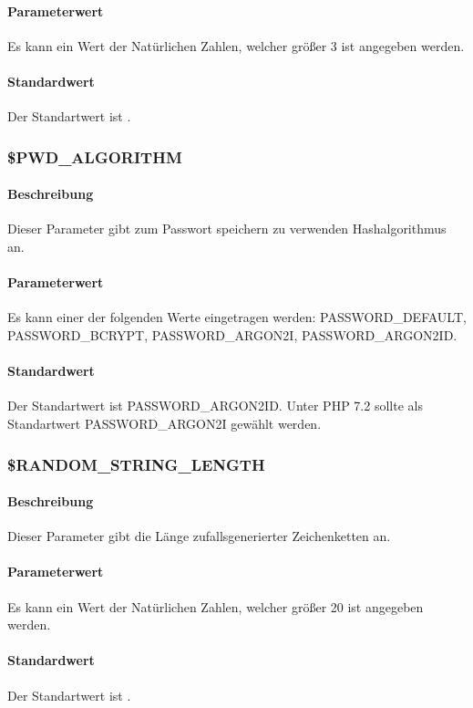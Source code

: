 \paragraph{Parameterwert}Es kann ein Wert der Natürlichen Zahlen, welcher größer 3 ist angegeben werden.
\paragraph{Standardwert}Der Standartwert ist {\grqq}.

\subsubsection{\$PWD\_ALGORITHM}
\paragraph{Beschreibung}Dieser Parameter gibt zum Passwort speichern zu verwenden Hashalgorithmus an. 
\paragraph{Parameterwert}Es kann einer der folgenden Werte eingetragen werden: {\glqq PASSWORD\_DEFAULT\grqq}, {\glqq PASSWORD\_BCRYPT\grqq}, {\glqq PASSWORD\_ARGON2I\grqq}, {\glqq PASSWORD\_ARGON2ID\grqq}.
\paragraph{Standardwert}Der Standartwert ist {\glqq PASSWORD\_ARGON2ID\grqq}. Unter PHP 7.2 sollte als Standartwert {\glqq PASSWORD\_ARGON2I\grqq} gewählt werden.

\subsubsection{\$RANDOM\_STRING\_LENGTH}
\paragraph{Beschreibung}Dieser Parameter gibt die Länge zufallsgenerierter Zeichenketten an.
\paragraph{Parameterwert}Es kann ein Wert der Natürlichen Zahlen, welcher größer 20 ist angegeben werden.
\paragraph{Standardwert}Der Standartwert ist {\grqq}.

